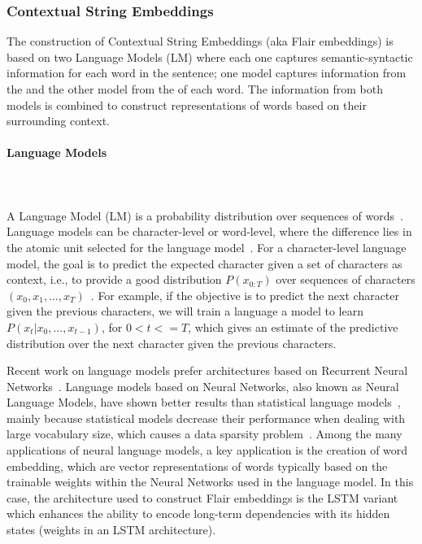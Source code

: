 \subsubsection{Contextual String Embeddings}
\label{cap2:theoFrame/infExtr/sequenceLabeling/contextualEmbeddings}
The construction of Contextual String Embeddings (aka Flair embeddings) is based on two 
Language Models (LM) where each one captures semantic-syntactic information for each word in 
the sentence; one model captures information from the  and the other model from 
the  of each word. The information from both models is combined to construct 
representations of words based on their surrounding context.

\paragraph{Language Models} 
\label{cap2:theoFrame/infExtr/sequenceLabeling/contextualEmbeddings/languageModel}
\mbox{}\\
\mbox{}\\
A Language Model (LM) is a probability distribution over sequences of words~\cite{seqlab:PonteC98}. 
Language models can be character-level or word-level, where the difference lies in the atomic 
unit selected for the language model~\cite{seqlab:PonteC98}. For a character-level language model, 
the goal is to predict the expected character given a set of characters as context, i.e., to 
provide a good distribution $P(x_{0:T})$  over sequences of characters 
$(x_0, x_1,\ldots,x_T)$~\cite{seqlab:Graves13}. For example, if the objective is to predict the 
next character given the previous characters, we will train a language a model to learn 
$P(x_t|x_0,..., x_{t-1})$, for $0 < t <= T$, which gives an estimate of the predictive 
distribution over the next character given the previous characters.

Recent work on language models prefer architectures based on Recurrent Neural Networks~\cite{seqlab:contextual-emb-AkbikBV18}. 
Language models based on Neural Networks, also known as Neural Language Models, have shown 
better results than statistical language models~\cite{seqlab:Graves13}, mainly because 
statistical models decrease their performance when dealing with large vocabulary size, which 
causes a data sparsity problem~\cite{seqlab:Egghe07a}. Among the many applications of neural 
language models, a key application is the creation of word embedding, which are vector 
representations of words typically based on the trainable weights within the Neural Networks 
used in the language model. In this case, the architecture used to construct Flair embeddings 
is the LSTM variant~\cite{seqlab:HochreiterS97,seqlab:Graves13,seqlab:ZarembaSV14} which 
enhances the ability to encode long-term dependencies with its hidden states (weights in an LSTM 
architecture).

